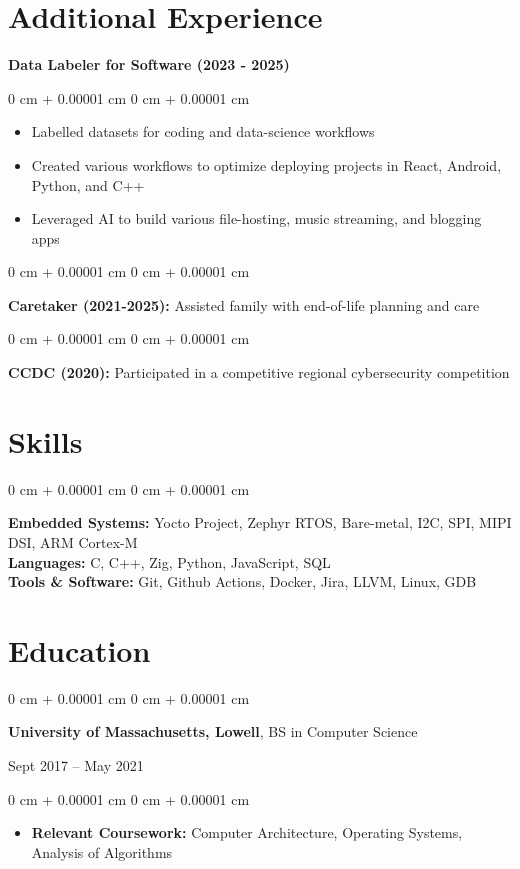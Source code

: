 \documentclass[10pt, letterpaper]{article}
\newenvironment{onecolentry}{
    \begin{adjustwidth}{
        0 cm + 0.00001 cm
    }{
        0 cm + 0.00001 cm
    }
}{
    \end{adjustwidth}
} %
\newenvironment{twocolentry}[2][]{
    \onecolentry
    \def\secondColumn{#2}
    \setcolumnwidth{\fill, 6.0 cm}
    \begin{paracol}{2}
}{
    \switchcolumn \raggedleft \secondColumn
    \end{paracol}
    \endonecolentry
} %
\begin{document}
    \section{Additional Experience}
      \textbf{Data Labeler for Software (2023 - 2025)}

        \vspace{0.10 cm}
        \begin{onecolentry}
          \begin{itemize}
                \item Labelled datasets for coding and data-science workflows
                \item Created various workflows to optimize deploying projects in React, Android, Python, and C++
                \item Leveraged AI to build various file-hosting, music streaming, and blogging apps
              \end{itemize}
        \end{onecolentry}

        \vspace{0.2 cm}

        \begin{onecolentry}
            \textbf{Caretaker (2021-2025):} Assisted family with end-of-life planning and care
          \end{onecolentry}
        
        \vspace{0.2 cm}

        \begin{onecolentry}
            \textbf{CCDC (2020):} Participated in a competitive regional cybersecurity competition
          \end{onecolentry}

    \section{Skills}
        \begin{onecolentry}
            \textbf{Embedded Systems:} Yocto Project, Zephyr RTOS, Bare-metal, I2C, SPI, MIPI DSI, ARM Cortex-M \\
            \textbf{Languages:} C, C++, Zig, Python, JavaScript, SQL \\
            \textbf{Tools \& Software:} Git, Github Actions, Docker, Jira, LLVM, Linux, GDB
        \end{onecolentry}

    \section{Education}
        \begin{twocolentry}{
            Sept 2017 – May 2021
        }
            \textbf{University of Massachusetts, Lowell}, BS in Computer Science
        \end{twocolentry}

        \vspace{0.10 cm}
        \begin{onecolentry}
          \begin{itemize}
                \item \textbf{Relevant Coursework:} Computer Architecture, Operating Systems, Analysis of Algorithms
              \end{itemize}
        \end{onecolentry}
\end{document}
